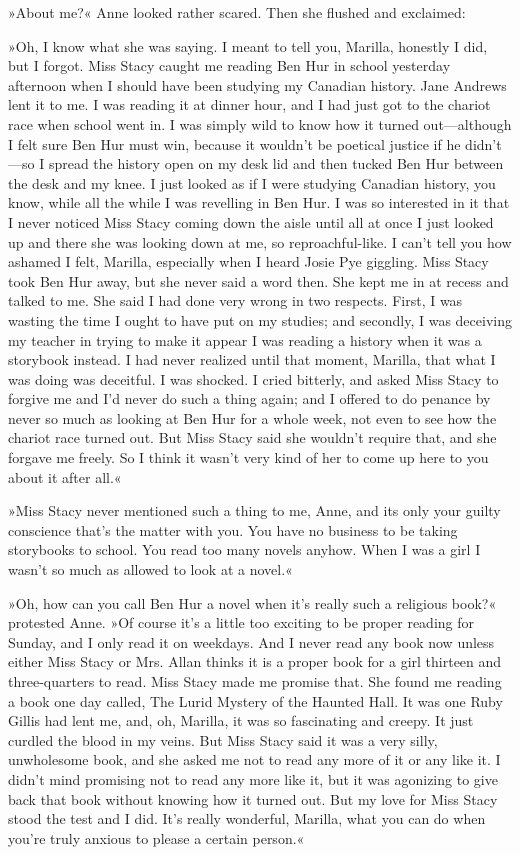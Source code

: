 »About me?« Anne looked rather scared. Then she flushed and exclaimed:

»Oh, I know what she was saying. I meant to tell you, Marilla, honestly I did, but I forgot. Miss Stacy caught me reading Ben Hur in school yesterday afternoon when I should have been studying my Canadian history. Jane Andrews lent it to me. I was reading it at dinner hour, and I had just got to the chariot race when school went in. I was simply wild to know how it turned out—although I felt sure Ben Hur must win, because it wouldn't be poetical justice if he didn't—so I spread the history open on my desk lid and then tucked Ben Hur between the desk and my knee. I just looked as if I were studying Canadian history, you know, while all the while I was revelling in Ben Hur. I was so interested in it that I never noticed Miss Stacy coming down the aisle until all at once I just looked up and there she was looking down at me, so reproachful-like. I can't tell you how ashamed I felt, Marilla, especially when I heard Josie Pye giggling. Miss Stacy took Ben Hur away, but she never said a word then. She kept me in at recess and talked to me. She said I had done very wrong in two respects. First, I was wasting the time I ought to have put on my studies; and secondly, I was deceiving my teacher in trying to make it appear I was reading a history when it was a storybook instead. I had never realized until that moment, Marilla, that what I was doing was deceitful. I was shocked. I cried bitterly, and asked Miss Stacy to forgive me and I'd never do such a thing again; and I offered to do penance by never so much as looking at Ben Hur for a whole week, not even to see how the chariot race turned out. But Miss Stacy said she wouldn't require that, and she forgave me freely. So I think it wasn't very kind of her to come up here to you about it after all.«

»Miss Stacy never mentioned such a thing to me, Anne, and its only your guilty conscience that's the matter with you. You have no business to be taking storybooks to school. You read too many novels anyhow. When I was a girl I wasn't so much as allowed to look at a novel.«

»Oh, how can you call Ben Hur a novel when it's really such a religious book?« protested Anne. »Of course it's a little too exciting to be proper reading for Sunday, and I only read it on weekdays. And I never read any book now unless either Miss Stacy or Mrs. Allan thinks it is a proper book for a girl thirteen and three-quarters to read. Miss Stacy made me promise that. She found me reading a book one day called, The Lurid Mystery of the Haunted Hall. It was one Ruby Gillis had lent me, and, oh, Marilla, it was so fascinating and creepy. It just curdled the blood in my veins. But Miss Stacy said it was a very silly, unwholesome book, and she asked me not to read any more of it or any like it. I didn't mind promising not to read any more like it, but it was agonizing to give back that book without knowing how it turned out. But my love for Miss Stacy stood the test and I did. It's really wonderful, Marilla, what you can do when you're truly anxious to please a certain person.«

